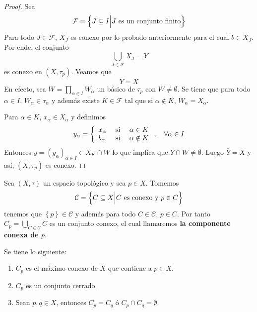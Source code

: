 \documentclass[12pt]{report}
\theoremstyle{largebreak}
\newcommand{\Cls}[1]{\ensuremath{\overline{#1}}}
\begin{document}
\begin{proof}
        Sea
        \begin{equation*}
            \mathcal{F}=\left\{J\subseteq I\Big|J\textup{ es un conjunto finito} \right\}
        \end{equation*}
        Para todo $J\in\mathcal{F}$, $X_J$ es conexo por lo probado anteriormente para el cual $b\in X_J$. Por ende, el conjunto
        \begin{equation*}
            \bigcup_{ J\in\mathcal{F}}X_J=Y
        \end{equation*}
        es conexo en $(X,\tau_p)$. Veamos que
        \begin{equation*}
            \Cls{Y}=X
        \end{equation*}
        En efecto, sea $W=\prod_{\alpha\in I}W_\alpha$ un básico de $\tau_p$ con $W\neq\emptyset$. Se tiene que para todo $\alpha\in I$, $W_\alpha\in\tau_\alpha$ y además existe $K\in\mathcal{F}$ tal que si $\alpha\notin K$, $W_\alpha=X_\alpha$.

        Para $\alpha\in K$, $x_\alpha\in X_\alpha$ y definimos
        \begin{equation*}
            y_\alpha=\left\{
                \begin{array}{lcr}
                    x_\alpha & \textup{ si } & \alpha\in K\\
                    b_\alpha & \textup{ si } & \alpha\notin K\\
                \end{array}
            \right.,\quad\forall\alpha\in I
        \end{equation*}
        Entonces $y=(y_\alpha)_{\alpha\in I}\in X_K\cap W$ lo que implica que $Y\cap W\neq\emptyset$. Luego $\Cls{Y}=X$ y así, $(X,\tau_p)$ es conexo.
    \end{proof}

    \begin{mydef}
        Sea $(X,\tau)$ un espacio topológico y sea $p\in X$. Tomemos
        \begin{equation*}
            \mathcal{C}=\left\{C\subseteq X\Big|C\textup{ es conexo y }p\in C \right\}
        \end{equation*}
        tenemos que $\left\{p\right\}\in\mathcal{C}$ y además para todo $C\in\mathcal{C}$, $p\in C$. Por tanto $C_p=\bigcup_{ C\in\mathcal{C}}C$ es un conjunto conexo, el cual llamaremos \textbf{la componente conexa de $p$}.
    \end{mydef}

    \begin{obs}
        Se tiene lo siguiente:
        \begin{enumerate}
            \item $C_p$ es el máximo conexo de $X$ que contiene a $p\in X$.
            \item $C_p$ es un conjunto cerrado.
            \item Sean $p,q\in X$, entonces $C_p=C_q$ ó $C_p\cap C_q=\emptyset$.
        \end{enumerate}
    \end{obs}
\end{document}
